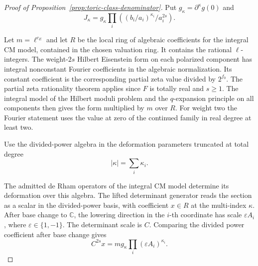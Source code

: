\begin{proof}[Proof of Proposition~\ref{prop:toric-class-denominator}]
Put \(g_\kappa=\partial^\kappa g(0)\) and
\[
 J_\kappa=g_\kappa\prod_i((b_i/a_i)^{\kappa_i}/a_i^{2s}).
\]

Let \(m=\ell^{c_E}\) and let \(R\) be the local ring
of algebraic coefficients for the integral CM model,
contained in the chosen valuation ring. It contains
the rational \(\ell\)-integers. The weight-\(2s\) Hilbert
Eisenstein form on each polarized component has
integral nonconstant Fourier coefficients in the
algebraic normalization. Its constant coefficient
is the corresponding partial zeta value divided
by \(2^{f_0}\). The partial zeta rationality theorem
applies since \(F\) is totally real and \(s\ge1\).
The integral model of the Hilbert moduli problem
and the \(q\)-expansion principle on all components
then gives the form multiplied by \(m\) over \(R\).
For weight two the Fourier statement uses the value
at zero of the continued family in real degree at
least two. \cite{deligne-pappas,serre-tate}\label{cor:toric-twist-3}

Use the divided-power algebra in the deformation parameters truncated at total degree
\[
 |\kappa|=\sum_i\kappa_i.
\]

The admitted de Rham operators of the integral CM
model determine its deformation over this algebra.
The lifted determinant generator reads the section
as a scalar in the divided-power basis, with
coefficient \(x\in R\) at the multi-index \(\kappa\).
After base change to \(\mathbb C\), the lowering
direction in the \(i\)-th coordinate has scale
\(\varepsilon A_i\), where \(\varepsilon\in\{1,-1\}\).
The determinant scale is \(C\). Comparing the divided
power coefficient after base change gives
\[
       C^{2s}x=m g_\kappa\prod_i(\varepsilon A_i)^{\kappa_i}.
\]


\end{proof}
